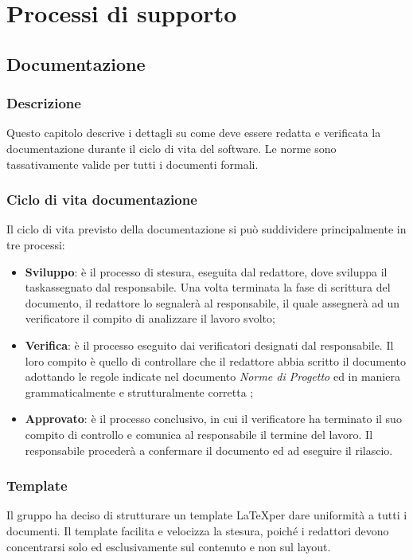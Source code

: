 \section{Processi di supporto}\label{ProcessiSupporto}

\subsection{Documentazione}\label{ProcessiSupporto_Documentazione}

\subsubsection{Descrizione}
Questo capitolo descrive i dettagli su come deve essere redatta e verificata la documentazione durante il ciclo di vita del software. Le norme sono tassativamente valide per tutti i documenti formali.
\subsubsection{Ciclo di vita documentazione}
Il ciclo di vita previsto della documentazione si può suddividere principalmente in tre processi: 
\begin{itemize}
	\item \textbf{Sviluppo}: è il processo di stesura, eseguita dal redattore, dove sviluppa il task\glossario assegnato dal responsabile. Una volta terminata la fase di scrittura del documento, il redattore lo segnalerà al responsabile, il quale assegnerà ad un verificatore il compito di analizzare il lavoro svolto;
 	\item \textbf{Verifica}: è il processo eseguito dai verificatori designati dal responsabile. Il loro compito è quello di controllare che il redattore abbia scritto il documento adottando le regole indicate nel documento \textit{Norme di Progetto} ed in maniera grammaticalmente e strutturalmente corretta ;
 	\item \textbf{Approvato}: è il processo conclusivo, in cui il verificatore ha terminato il suo compito di controllo e comunica al responsabile il termine del lavoro. Il responsabile procederà a confermare il documento ed ad eseguire il rilascio.
\end{itemize} 

\subsubsection{Template}
Il gruppo ha deciso di strutturare un template \LaTeX  per dare uniformità a tutti i documenti. Il template facilita e velocizza la stesura, poiché i redattori devono concentrarsi solo ed esclusivamente sul contenuto e non sul layout.  

